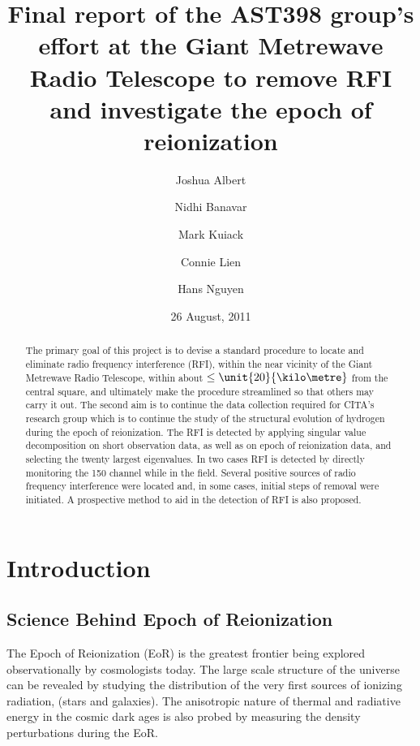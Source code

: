 \documentclass[a4paper,12pt]{article}
\begin{document}
\onehalfspacing
\title{Final report of the AST398 group's effort at the Giant Metrewave Radio Telescope to remove RFI and investigate the epoch of reionization}
\author{Joshua Albert \and Nidhi Banavar \and Mark Kuiack \and Connie Lien \and Hans Nguyen}
\date{26 August, 2011}
\maketitle

\begin{abstract}
\label{abstract}

The primary goal of this project is to devise a standard procedure to locate and eliminate radio frequency interference (RFI), within the near vicinity of the Giant Metrewave Radio Telescope, within about $\le\unit{20}{\kilo\metre}$ from the central square, and ultimately make the procedure streamlined so that others may carry it out. The second aim is to continue the data collection required for CITA's research group which is to continue the study of the structural evolution of hydrogen during the epoch of reionization. The RFI is detected by applying singular value decomposition on short observation data, as well as on epoch of reionization data, and selecting the twenty largest eigenvalues. In two cases RFI is detected by directly monitoring the \unit{150}{\mega\hertz} channel while in the field. Several positive sources of radio frequency interference were located and, in some cases, initial steps of removal were initiated. A prospective method to aid in the detection of RFI is also proposed. 

\end{abstract}

\section{Introduction}
\label{sec:introduction}

\subsection{Science Behind Epoch of Reionization}
\label{sec:sciencebehindepochofreionization}

The Epoch of Reionization (EoR) is the greatest frontier being explored observationally by cosmologists today. The large scale structure of the universe can be revealed by studying the distribution of the very first sources of ionizing radiation, (stars and galaxies).  The anisotropic nature of thermal and radiative energy in the cosmic dark ages is also probed by measuring the density perturbations during the EoR. 
\end{document}
